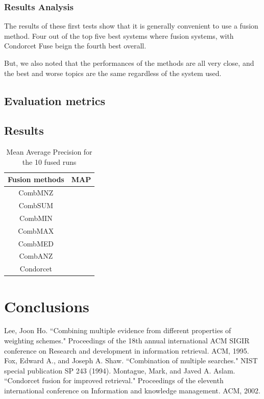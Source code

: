 	\subsubsection{Results Analysis}
	The results of these first tests show that it is generally convenient to use a fusion method.
	Four out of the top five best systems where fusion systems, with Condorcet Fuse beign the fourth best overall.
	
	But, we also noted that the performances of the methods are all very close, and the best and worse topics are the same regardless of the system used.

        \subsection{Evaluation metrics}

	    \subsection{Results}

		\begin{table}[H]
		    \centering
		    \begin{tabular}{c p{4cm}}
		    \toprule
		    \textbf{Fusion methods} & \textbf{MAP} \\ \toprule
		    CombMNZ &  \\ \hline
		    CombSUM &  \\ \hline
		    CombMIN &  \\ \hline
		    CombMAX &  \\ \hline
		    CombMED &  \\ \hline
		    CombANZ &  \\ \hline
			Condorcet &  \\ \bottomrule
		    \end{tabular}
		    \caption{Mean Average Precision for the 10 fused runs}
		\end{table}

	\section{Conclusions}
	
	\clearpage
	\begin{thebibliography}{1}
		Lee, Joon Ho. ``Combining multiple evidence from different properties of weighting schemes." Proceedings of the 18th annual international ACM SIGIR conference on Research and development in information retrieval. ACM, 1995.
		Fox, Edward A., and Joseph A. Shaw. ``Combination of multiple searches." NIST special publication SP 243 (1994).
		Montague, Mark, and Javed A. Aslam. ``Condorcet fusion for improved retrieval." Proceedings of the eleventh international conference on Information and knowledge management. ACM, 2002.
		
	\end{thebibliography}
	


